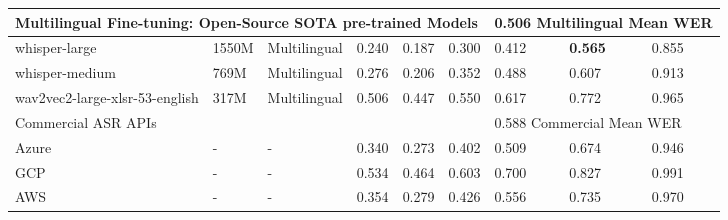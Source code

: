 \documentclass{INTERSPEECH2023}
\begin{document}
\begin{table*}[t]
\begin{tabular}{l|l|l|l|l|l|l|l|l}
\midrule
\multicolumn{6}{l}{Multilingual Fine-tuning: Open-Source SOTA pre-trained Models } & \multicolumn{3}{l}{0.506 Multilingual Mean WER}\\
\hline
whisper-large & 1550M & Multilingual  & 0.240  & 0.187  & 0.300  & 0.412 & \textbf{0.565} & 0.855 \\
whisper-medium & 769M & Multilingual   & 0.276  & 0.206  & 0.352  & 0.488  & 0.607 & 0.913  \\
wav2vec2-large-xlsr-53-english & 317M & Multilingual   & 0.506  & 0.447  & 0.550  & 0.617  & 0.772 & 0.965  \\

\midrule
\multicolumn{6}{l}{Commercial ASR APIs} & \multicolumn{3}{l}{0.588 Commercial Mean WER}\\
\hline
Azure\cite{azure}  & - & -     & 0.340  & 0.273  & 0.402  & 0.509  & 0.674 & 0.946 \\
GCP\cite{gcp}  & - & -     & 0.534  & 0.464  & 0.603  & 0.700  & 0.827 & 0.991 \\
AWS\cite{aws}  & - & -     & 0.354  & 0.279  & 0.426  & 0.556  & 0.735 & 0.970  \\


\midrule


\end{tabular}
\end{table*}
\end{document}
